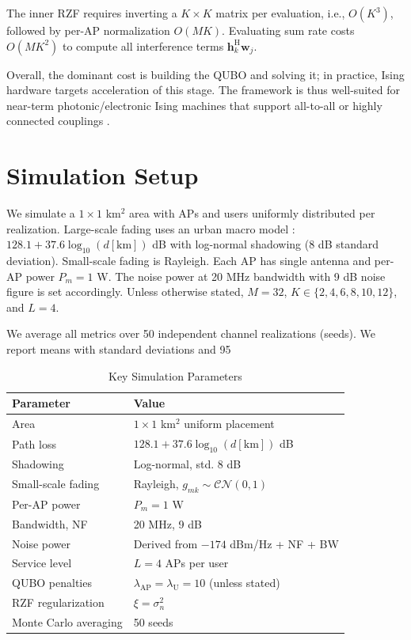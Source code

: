 The inner RZF requires inverting a $K\times K$ matrix per evaluation, i.e., $O(K^3)$, followed by per-AP normalization $O(MK)$. Evaluating sum rate costs $O(MK^2)$ to compute all interference terms $\mathbf{h}_k^\mathrm{H}\mathbf{w}_j$.

Overall, the dominant cost is building the QUBO and solving it; in practice, Ising hardware targets acceleration of this stage. The framework is thus well-suited for near-term photonic/electronic Ising machines that support all-to-all or highly connected couplings \cite{mcmahon2016fully,inagaki2016coherent}.

\section{Simulation Setup}
We simulate a $1\times 1$ km$^2$ area with APs and users uniformly distributed per realization. Large-scale fading uses an urban macro model \cite{bjornson2016massive}: $128.1+37.6\log_{10}(d[\mathrm{km}])$ dB with log-normal shadowing (8 dB standard deviation). Small-scale fading is Rayleigh. Each AP has single antenna and per-AP power $P_m=1$ W. The noise power at 20 MHz bandwidth with 9 dB noise figure is set accordingly. Unless otherwise stated, $M=32$, $K\in\{2,4,6,8,10,12\}$, and $L=4$.

We average all metrics over 50 independent channel realizations (seeds). We report means with standard deviations and 95%

\begin{table}[htbp]
\caption{Key Simulation Parameters}
\centering
\small
\begin{tabular}{@{}ll@{}}
\toprule
Parameter & Value \\ \midrule
Area & $1\times 1$ km$^2$ uniform placement \\
Path loss & $128.1+37.6\log_{10}(d[\mathrm{km}])$ dB \\
Shadowing & Log-normal, std. 8 dB \\
Small-scale fading & Rayleigh, $g_{mk}\sim\mathcal{CN}(0,1)$ \\
Per-AP power & $P_m=1$ W \\
Bandwidth, NF & 20 MHz, 9 dB \\
Noise power & Derived from $-174$ dBm/Hz + NF + BW \\
Service level & $L=4$ APs per user \\
QUBO penalties & $\lambda_{\text{AP}}=\lambda_{\text{U}}=10$ (unless stated) \\
RZF regularization & $\xi=\sigma_n^2$ \\
Monte Carlo averaging & 50 seeds \\
\bottomrule
\end{tabular}
\end{table}

